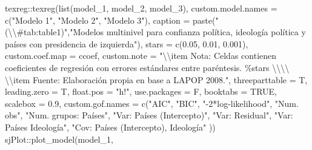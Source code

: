 \documentclass[
  12pt,
  a4paper,
]{article}
\newenvironment{Shaded}{\begin{snugshade}}{\end{snugshade}}
\newcommand{\AttributeTok}[1]{\textcolor[rgb]{0.77,0.63,0.00}{#1}}
\newcommand{\ConstantTok}[1]{\textcolor[rgb]{0.00,0.00,0.00}{#1}}
\newcommand{\FloatTok}[1]{\textcolor[rgb]{0.00,0.00,0.81}{#1}}
\newcommand{\FunctionTok}[1]{\textcolor[rgb]{0.00,0.00,0.00}{#1}}
\newcommand{\NormalTok}[1]{#1}
\newcommand{\SpecialCharTok}[1]{\textcolor[rgb]{0.00,0.00,0.00}{#1}}
\newcommand{\StringTok}[1]{\textcolor[rgb]{0.31,0.60,0.02}{#1}}
\begin{document}
\begin{Shaded}
\begin{Highlighting}[]
\NormalTok{texreg}\SpecialCharTok{::}\FunctionTok{texreg}\NormalTok{(}\FunctionTok{list}\NormalTok{(model\_1, model\_2, model\_3),}
               \AttributeTok{custom.model.names =} \FunctionTok{c}\NormalTok{(}\StringTok{"Modelo 1"}\NormalTok{,}
                                      \StringTok{"Modelo 2"}\NormalTok{,}
                                      \StringTok{"Modelo 3"}\NormalTok{),}
               \AttributeTok{caption =} \FunctionTok{paste}\NormalTok{(}\StringTok{"(}\SpecialCharTok{\textbackslash{}\textbackslash{}}\StringTok{\#tab:table1)"}\NormalTok{,}\StringTok{"Modelos multinivel para confianza política, ideología política y países con presidencia de izquierda"}\NormalTok{),}
               \AttributeTok{stars =} \FunctionTok{c}\NormalTok{(}\FloatTok{0.05}\NormalTok{, }\FloatTok{0.01}\NormalTok{, }\FloatTok{0.001}\NormalTok{),}
               \AttributeTok{custom.coef.map =}\NormalTok{ ccoef,}
               \AttributeTok{custom.note =} \StringTok{"}\SpecialCharTok{\textbackslash{}\textbackslash{}}\StringTok{item Nota: Celdas contienen coeficientes de regresión con errores estándares entre paréntesis. \%stars }\SpecialCharTok{\textbackslash{}\textbackslash{}\textbackslash{}\textbackslash{}}\StringTok{ }\SpecialCharTok{\textbackslash{}\textbackslash{}}\StringTok{item Fuente: Elaboración propia en base a LAPOP 2008."}\NormalTok{,}
               \AttributeTok{threeparttable =}\NormalTok{ T,}
               \AttributeTok{leading.zero =}\NormalTok{ T,}
               \AttributeTok{float.pos =} \StringTok{"h!"}\NormalTok{,}
               \AttributeTok{use.packages =}\NormalTok{ F,}
               \AttributeTok{booktabs =} \ConstantTok{TRUE}\NormalTok{,}
               \AttributeTok{scalebox =} \FloatTok{0.9}\NormalTok{,}
               \AttributeTok{custom.gof.names =} \FunctionTok{c}\NormalTok{(}\StringTok{"AIC"}\NormalTok{, }
                                    \StringTok{"BIC"}\NormalTok{, }
                                    \StringTok{"{-}2*log{-}likelihood"}\NormalTok{, }
                                    \StringTok{"Num. obs"}\NormalTok{, }
                                    \StringTok{"Num. grupos: Países"}\NormalTok{,}
                                    \StringTok{"Var: Países (Intercepto)"}\NormalTok{,}
                                    \StringTok{"Var: Residual"}\NormalTok{,}
                                    \StringTok{"Var: Países Ideología"}\NormalTok{,}
                                    \StringTok{"Cov: Países (Intercepto), Ideología"}
\NormalTok{                                    ))}
\NormalTok{sjPlot}\SpecialCharTok{::}\FunctionTok{plot\_model}\NormalTok{(model\_1, }

\end{Highlighting}
\end{Shaded}
\end{document}
